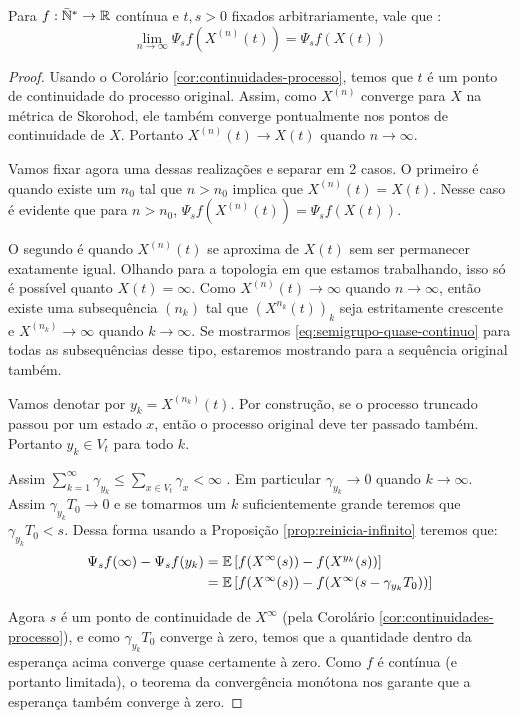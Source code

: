\begin{proposicao}
  \label{prop:semigrupo-quase-continuo}
  Para $f: {\mathbb{\bar{N}^*}} \to {\mathbb{R}}$ contínua e $t, s > 0$ fixados arbitrariamente,
  vale que \qc:
  \begin{equation}
    \label{eq:semigrupo-quase-continuo}
    \lim_{n \to \infty} \Psi_s f (X^{(n)}(t)) = \Psi_s f(X(t))
  \end{equation}
\end{proposicao}
\begin{proof}
  Usando o Corolário \ref{cor:continuidades-processo}, temos que $t$ é
  \qc um ponto de continuidade do processo original. Assim, como
  $X^{(n)}$ converge \qc para $X$ na métrica de Skorohod, ele também
  converge pontualmente nos pontos de continuidade de $X$. Portanto
  $X^{(n)}(t) \to X(t)$ \qc quando $n \to \infty$.

  Vamos fixar agora uma dessas realizações e separar em 2 casos. O
  primeiro é quando existe um $n_0$ tal que $n > n_0$ implica que
  $X^{(n)}(t) = X(t)$. Nesse caso é evidente que para $n > n_0$,
  $\Psi_s f (X^{(n)}(t)) = \Psi_s f(X(t))$.

  O segundo é quando $X^{(n)}(t)$ se aproxima de $X(t)$ sem ser
  permanecer exatamente igual. Olhando para a topologia em que estamos
  trabalhando, isso só é possível quanto $X(t) = \infty$.  Como
  $X^{(n)}(t) \to \infty$ quando $n \to \infty$, então existe uma
  subsequência $(n_k)$ tal que $(X^{n_k}(t))_k$ seja estritamente
  crescente e $X^{(n_k)} \to \infty$ quando $k \to \infty$. Se
  mostrarmos \eqref{eq:semigrupo-quase-continuo} para todas as
  subsequências desse tipo, estaremos mostrando para a sequência
  original também.

  Vamos denotar por $y_k = X^{(n_k)}(t)$. Por construção, se o processo
  truncado passou por um estado $x$, então o processo original deve
  ter passado também. Portanto $y_k \in V_t$ para todo $k$.

  Assim $\sum_{k = 1}^{\infty}\gamma_{y_k} \leq \sum_{x \in V_t}
  \gamma_x < \infty$ \qc. Em particular $\gamma_{y_k} \to 0$ quando
  $k\to\infty$. Assim $\gamma_{y_k} T_0 \to 0$ e se tomarmos um $k$
  suficientemente grande teremos que $\gamma_{y_k} T_0 < s$. Dessa
  forma usando a Proposição \ref{prop:reinicia-infinito} teremos que:
  \begin{align*}
    \Psi_s f (\infty) - \Psi_s f (y_k) &=
    {\mathbb{E}}\left[ f(X^\infty(s)) - f(X^{y_k}(s)) \right] \\
    &= {\mathbb{E}}\left[ f(X^\infty(s)) -f (X^\infty(s - \gamma_{y_k}T_0)) \right] \\
  \end{align*}

  Agora $s$ é \qc um ponto de continuidade de $X^\infty$ (pela
  Corolário \ref{cor:continuidades-processo}), e como $\gamma_{y_k}
  T_0$ converge à zero, temos que a quantidade dentro da esperança
  acima converge quase certamente à zero. Como $f$ é contínua (e
  portanto limitada), o teorema da convergência monótona nos garante
  que a esperança também converge à zero.
\end{proof}


